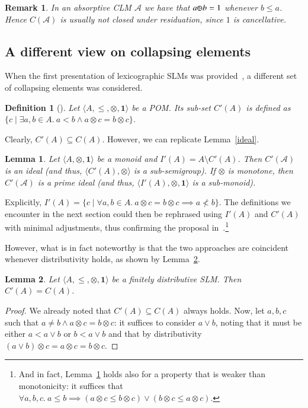 \documentclass[a4paper]{elsarticle}
\newtheorem{definition}{Definition}
\newtheorem{remark}{Remark}
\newtheorem{lemma}{Lemma}
\newcommand{\monop}{\otimes}
\newcommand{\1}{\mathbf{1}}
\def\odiv{{ \ominus\hspace{-8pt}:}\;}
\begin{document}
\begin{remark}
	In an absorptive CLM $\mathcal{A}$ we have that $a \odiv b = 1$ 
	whenever $b \leq a$. Hence $C(\mathcal{A})$ is usually not closed under residuation, since 
	$1$ is cancellative.
\end{remark}

\subsection{A different view on collapsing elements}

When the first presentation of lexicographic 
SLMs was provided~\cite{GadducciHMW13}, a different 
set of collapsing elements was considered.

\begin{definition}[\cite{GadducciHMW13}]
	Let $\langle A, \leq, \monop, \1 \rangle$ be a POM. Its sub-set $C'(A)$ 
	is defined as 
	$\{ c \mid \exists a, b \in A.\ a < b \wedge a \otimes c = b \otimes c\}$.
\end{definition}

Clearly, $C'(A) \subseteq C(A)$. However, we can replicate Lemma~\ref{ideal}.
%

\begin{lemma}\label{lemma:six}
	Let $\langle A, \monop, \1 \rangle$ be a monoid
	and $I'(A) = A \setminus C'(A)$.
	Then $C'(\mathcal{A})$ is an ideal 
	(and thus, $\langle C'(A), \monop \rangle$ is a sub-semigroup).
	If $\monop$ is monotone, then 
	$C'(\mathcal{A})$ is a prime ideal
	(and thus, $\langle I'(A), \monop, \1 \rangle$ is a sub-monoid).
\end{lemma}

Explicitly, $I'(A) = \{ c \mid \forall a, b \in A.\ a \otimes c = b \otimes c \implies a \not < b \}$.
%
The definitions we encounter in the next section 
could then be rephrased using 
$I'(A)$ and $C'(A)$ with minimal adjustments, thus confirming the proposal
in~\cite{GadducciHMW13}.\footnote{And in fact,  Lemma~\ref{lemma:six} holds also for 
	a property that is weaker than monotonicity: it suffices that 
	$\forall a, b, c.\ a \leq b \implies (a \otimes c \leq b \otimes c) \vee (b \otimes c \leq a \otimes c)$.
}

However, what is in fact noteworthy is that the two approaches are coincident
whenever distributivity holds, as shown by  Lemma~\ref{lemma:seven}.

\begin{lemma}\label{lemma:seven}
	Let $\langle A, \leq, \monop, \1 \rangle$ be a finitely distributive SLM.
	Then $C'(A) = C(A)$.
\end{lemma}
\begin{proof}
	We already noted that $C'(A) \subseteq C(A)$ always holds. Now, let $a, b, c$ such that
	$a \neq b \wedge a \otimes c = b \otimes c$: it suffices to consider $a \vee b$, noting 
	that it must be either $a < a \vee b$ or $b < a \vee b$ and that by distributivity 
	$(a \vee b) \otimes c = a \otimes c = b \otimes c$.
\end{proof}
\end{document}

